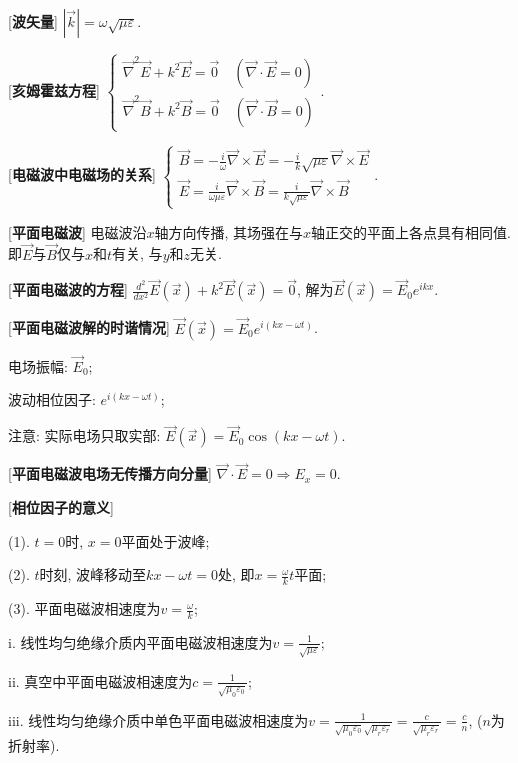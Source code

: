 [\textbf{波矢量}] $|\vec k|=\omega\sqrt{\mu\varepsilon}$.\par

[\textbf{亥姆霍兹方程}] $\begin{cases}\vec\nabla^2\vec E+k^2\vec E=\vec 0\quad (\vec\nabla\cdot\vec E=0)\\\vec\nabla^2\vec B+k^2\vec B=\vec 0\quad(\vec\nabla\cdot\vec B=0)\end{cases}$.\par

[\textbf{电磁波中电磁场的关系}] $\begin{cases}\vec B=-\frac{i}{\omega}\vec\nabla\times\vec E=-\frac{i}{k}\sqrt{\mu\varepsilon}\vec\nabla\times\vec E\\\vec E=\frac{i}{\omega\mu\varepsilon}\vec\nabla\times\vec B=\frac{i}{k\sqrt{\mu\varepsilon}}\vec\nabla\times\vec B\end{cases}$.\par

[\textbf{平面电磁波}] 电磁波沿$x$轴方向传播, 其场强在与$x$轴正交的平面上各点具有相同值. 即$\vec E$与$\vec B$仅与$x$和$t$有关, 与$y$和$z$无关.\par

\clearpage

[\textbf{平面电磁波的方程}] $\frac{d^2}{dx^2}\vec E(\vec x)+k^2\vec E(\vec x)=\vec0$, 解为$\vec E(\vec x)=\vec E_0e^{ikx}$.\par

[\textbf{平面电磁波解的时谐情况}] $\vec E(\vec x)=\vec E_0e^{i(kx-\omega t)}$.\par
\qquad 电场振幅: $\vec E_0$;\par
\qquad 波动相位因子: $e^{i(kx-\omega t)}$;\par
\qquad 注意: 实际电场只取实部: $\vec E(\vec x)=\vec E_0\cos{(kx-\omega t)}$.\par

[\textbf{平面电磁波电场无传播方向分量}] $\vec\nabla\cdot\vec E=0\Rightarrow E_x=0$.\par

[\textbf{相位因子的意义}]\par
\qquad (1). $t=0$时, $x=0$平面处于波峰;\par
\qquad (2). $t$时刻, 波峰移动至$kx-\omega t=0$处, 即$x=\frac{\omega}{k}t$平面;\par
\qquad (3). 平面电磁波相速度为$v=\frac{\omega}{k}$;\par
\qquad\qquad i. 线性均匀绝缘介质内平面电磁波相速度为$v=\frac{1}{\sqrt{\mu\varepsilon}}$;\par
\qquad\qquad ii. 真空中平面电磁波相速度为$c=\frac{1}{\sqrt{\mu_0\varepsilon_0}}$;\par
\qquad\qquad iii. 线性均匀绝缘介质中单色平面电磁波相速度为$v=\frac{1}{\sqrt{\mu_0\varepsilon_0}\sqrt{\mu_r\varepsilon_r}}=\frac{c}{\sqrt{\mu_r\varepsilon_r}}=\frac{c}{n}$, ($n$为折射率).\par

